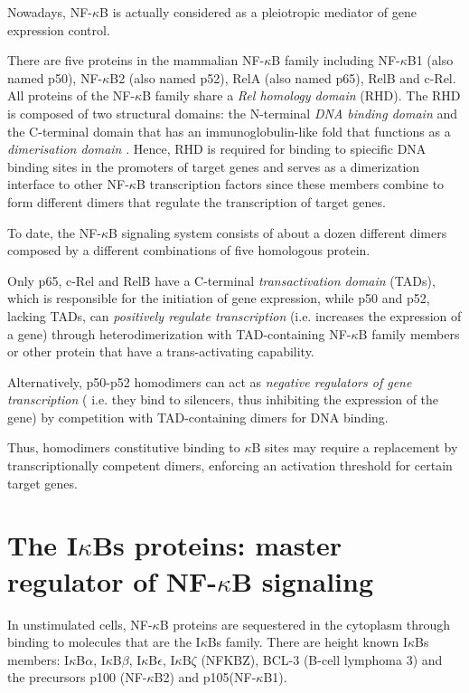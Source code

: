 \documentclass[12pt,a4paper]{report}
\begin{document}
Nowadays, NF-$\kappa$B is actually considered as a pleiotropic mediator of gene expression control. 


There are five proteins in the mammalian NF-$\kappa$B family including NF-$\kappa$B1 (also named p50), NF-$\kappa$B2 (also named p52), RelA (also named p65), RelB and c-Rel. All proteins of the NF-$\kappa$B family share a \emph{Rel homology domain} (RHD). The RHD is composed of two structural domains: the N-terminal \emph{DNA binding domain} and the C-terminal domain that has an immunoglobulin-like fold that functions as a \emph{dimerisation domain} \cite{domain}. Hence, RHD is required for binding to spiecific DNA binding sites in the promoters of target genes and serves as a dimerization interface to other NF-$\kappa$B transcription factors since these members combine to form different dimers that regulate the transcription of target genes. %

To date, the NF-$\kappa$B signaling system consists of about a dozen different dimers composed by a different combinations of five homologous protein.

Only p65, c-Rel and RelB have a C-terminal \emph{transactivation domain} (TADs), which is responsible for the initiation of gene expression, while p50 and p52, lacking TADs, can \emph{positively regulate transcription} (i.e. increases the expression of a gene) through heterodimerization with TAD-containing NF-$\kappa$B family members or other protein that have a trans-activating capability.

Alternatively, p50-p52 homodimers can act as \emph{negative regulators of gene transcription} ( i.e. they bind to silencers, thus inhibiting the expression of the gene) by competition with TAD-containing dimers for DNA binding.

Thus, homodimers constitutive binding to $\kappa$B sites may require a replacement by transcriptionally competent dimers, enforcing an activation threshold for certain target genes.

\section{The I\texorpdfstring{$\kappa$}{}Bs proteins: master regulator of NF-\texorpdfstring{$\kappa$}{}B signaling}\label{IkBs}
In unstimulated cells, NF-$\kappa$B proteins are sequestered in the cytoplasm through binding to molecules that are the I$\kappa$Bs family. There are height known I$\kappa$Bs members: I$\kappa$B$\alpha$, I$\kappa$B$\beta$, I$\kappa$B$\epsilon$, I$\kappa$B$\zeta$ (NFKBZ), BCL-3 (B-cell lymphoma 3) and the precursors p100 (NF-$\kappa$B2) and p105(NF-$\kappa$B1). 
\end{document}
